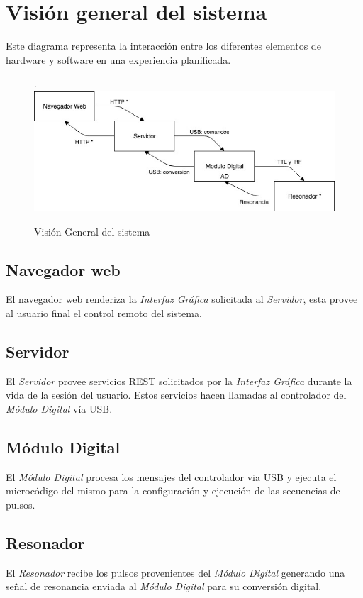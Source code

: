 \section{Visi\'on general del sistema}

Este diagrama representa la interacci\'on entre los diferentes elementos de hardware 
y software en una experiencia planificada.

\begin{figure}[!htb].
    \includegraphics[width=\linewidth]{../figures/d5.jpg}
    \caption{Visi\'on General del sistema}
    \label{fig:d5}
\end{figure}

\subsection{Navegador web}
El navegador web renderiza la \textit{Interfaz Gr\'afica} solicitada al \textit{Servidor}, esta provee al usuario final 
el control remoto del sistema.

\subsection{Servidor}
El \textit{Servidor} provee servicios REST solicitados por la \textit{Interfaz Gr\'afica} durante la vida
de la sesi\'on del usuario. Estos servicios hacen llamadas al controlador del \textit{M\'odulo
Digital} v\'ia USB.

\subsection{M\'odulo Digital}
El \textit{M\'odulo Digital} procesa los mensajes del controlador via USB y ejecuta 
el microc\'odigo del mismo para la configuraci\'on y ejecuci\'on de las secuencias de pulsos.

\subsection{Resonador}
El \textit{Resonador} recibe los pulsos provenientes del \textit{M\'odulo Digital} generando una se\~nal de resonancia
enviada al \textit{M\'odulo Digital} para su conversi\'on digital.

\newpage